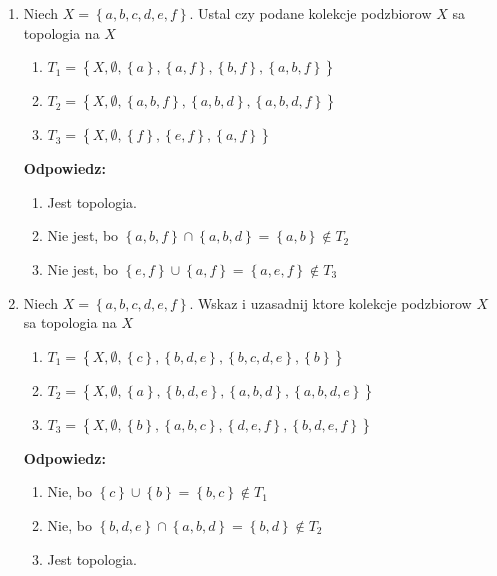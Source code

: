 \documentclass{article}
\begin{document}
\begin{enumerate}
    \item Niech $X = \left\{a,b,c,d,e,f\right\}.$ Ustal czy podane kolekcje podzbiorow $X$ sa topologia na $X$

        \begin{enumerate}[label=(\alph*)]
            \item $T_{1} = \left\{X, \emptyset, \left\{a\right\}, \left\{a,f\right\}, \left\{b,f\right\}, \left\{a,b,f\right\}\right\}$
            \item  $T_{2} = \left\{X, \emptyset, \left\{a,b,f\right\}, \left\{a,b,d\right\}, \left\{a,b,d,f\right\}\right\}$
            \item $T_{3} = \left\{X, \emptyset, \left\{f\right\}, \left\{e,f\right\}, \left\{a,f\right\} \right\}$

        \end{enumerate}
        \textbf{Odpowiedz:}
        \begin{enumerate}[label=(\alph*)]
            \item Jest topologia.
            \item Nie jest, bo $\left\{a,b,f\right\} \cap \left\{a,b,d\right\}= \left\{a,b\right\} \notin T_{2}$ 
            \item Nie jest, bo $\left\{e,f\right\} \cup \left\{a,f\right\}=\left\{a,e,f\right\} \notin T_{3}$ 

        \end{enumerate} 
    \item Niech $X = \left\{a,b,c,d,e,f\right\}.$ Wskaz i uzasadnij ktore kolekcje podzbiorow $X$ sa topologia na $X$

        \begin{enumerate}[label=(\alph*)]
            \item $T_{1} = \left\{X, \emptyset, \left\{c\right\}, \left\{b,d,e\right\}, \left\{b,c,d,e\right\}, \left\{b\right\}\right\}$
            \item  $T_{2} = \left\{X, \emptyset,\left\{a\right\}, \left\{b,d,e\right\}, \left\{a,b,d\right\}, \left\{a,b,d,e\right\}\right\}$
            \item $T_{3} = \left\{X, \emptyset,\left\{b\right\}, \left\{a,b,c\right\}, \left\{d,e,f\right\}, \left\{b,d,e,f\right\} \right\}$

        \end{enumerate}

        \textbf{Odpowiedz:}

        \begin{enumerate}[label=(\alph*)]
            \item Nie, bo $\left\{c\right\} \cup \left\{b\right\} = \left\{b,c\right\} \notin T_{1}$
            \item Nie, bo $\left\{b,d,e\right\} \cap \left\{a,b,d\right\} = \left\{b,d\right\} \notin T_{2}$
            \item Jest topologia.
        \end{enumerate}


\end{enumerate}
\end{document}
